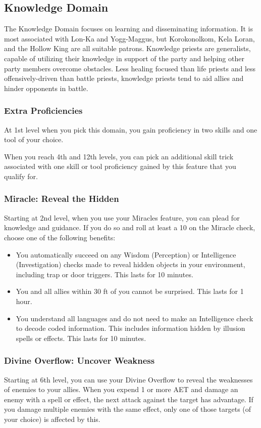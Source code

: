 \subsection{Knowledge Domain}

The Knowledge Domain focuses on learning and disseminating information. It is most associated with Lon-Ka and Yogg-Maggus, but Korokonolkom, Kela Loran, and the Hollow King are all suitable patrons. Knowledge priests are generalists, capable of utilizing their knowledge in support of the party and helping other party members overcome obstacles. Less healing focused than life priests and less offensively-driven than battle priests, knowledge priests tend to aid allies and hinder opponents in battle.

\subsubsection{Extra Proficiencies}
At 1st level when you pick this domain, you gain proficiency in two skills and one tool of your choice.

When you reach 4th and 12th levels, you can pick an additional skill trick associated with one skill or tool proficiency gained by this feature that you qualify for.

\subsubsection{Miracle: Reveal the Hidden}
Starting at 2nd level, when you use your Miracles feature, you can plead for knowledge and guidance. If you do so and roll at least a 10 on the Miracle check, choose one of the following benefits:
\begin{itemize}
	\item You automatically succeed on any Wisdom (Perception) or Intelligence (Investigation) checks made to reveal hidden objects in your environment, including trap or door triggers. This lasts for 10 minutes.
	\item You and all allies within 30 ft of you cannot be surprised. This lasts for 1 hour.
	\item You understand all languages and do not need to make an Intelligence check to decode coded information. This includes information hidden by illusion spells or effects. This lasts for 10 minutes.
\end{itemize}

\subsubsection{Divine Overflow: Uncover Weakness}
Starting at 6th level, you can use your Divine Overflow to reveal the weaknesses of enemies to your allies. When you expend 1 or more AET and damage an enemy with a spell or effect, the next attack against the target has advantage. If you damage multiple enemies with the same effect, only one of those targets (of your choice) is affected by this.

